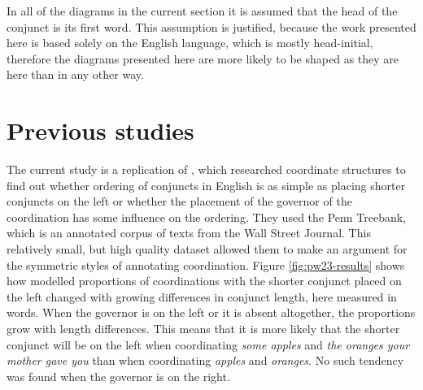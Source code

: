 \newlength{\treeheight}
\newlength{\treewidth}

In all of the diagrams in the current section it is assumed that the head of the conjunct is its first word. This assumption is justified, because the work presented here is based solely on the English language, which is mostly head-initial, therefore the diagrams presented here are more likely to be shaped as they are here than in any other way.






\section{Previous studies}\label{sec:previous}
The current study is a replication of \cite{prz:woz:23}, which researched coordinate structures to find out whether ordering of conjuncts in English is as simple as placing shorter conjuncts on the left or whether the placement of the governor of the coordination has some influence on the ordering. They used the Penn Treebank, which is an annotated corpus of texts from the Wall Street Journal. This relatively small, but high quality dataset allowed them to make an argument for the symmetric styles of annotating coordination. Figure \ref{fig:pw23-results} shows how modelled proportions of coordinations with the shorter conjunct placed on the left changed with growing differences in conjunct length, here measured in words. When the governor is on the left or it is absent altogether, the proportions grow with length differences. This means that it is more likely that the shorter conjunct will be on the left when coordinating \textsl{some apples} and \textsl{the oranges your mother gave you} than when coordinating \textsl{apples} and \textsl{oranges}. No such tendency was found when the governor is on the right. 

